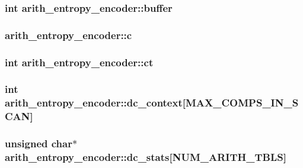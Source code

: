 \subsubsection[{buffer}]{\setlength{\rightskip}{0pt plus 5cm}int arith\+\_\+entropy\+\_\+encoder\+::buffer}\label{structarith__entropy__encoder_a404b730ace823b7212e4953146d02159}
\hypertarget{structarith__entropy__encoder_a84198956e6633b09fda5713b89164292}{}
\subsubsection[{c}]{ arith\+\_\+entropy\+\_\+encoder\+::c}\label{structarith__entropy__encoder_a84198956e6633b09fda5713b89164292}
\hypertarget{structarith__entropy__encoder_af636dab56c69b209b0bb5aefba723e80}{}
\subsubsection[{ct}]{\setlength{\rightskip}{0pt plus 5cm}int arith\+\_\+entropy\+\_\+encoder\+::ct}\label{structarith__entropy__encoder_af636dab56c69b209b0bb5aefba723e80}
\hypertarget{structarith__entropy__encoder_a1f8bc39ac0327ddbf46c65434d0ceb75}{}
\subsubsection[{dc\+\_\+context}]{\setlength{\rightskip}{0pt plus 5cm}int arith\+\_\+entropy\+\_\+encoder\+::dc\+\_\+context\mbox{[}{\bf M\+A\+X\+\_\+\+C\+O\+M\+P\+S\+\_\+\+I\+N\+\_\+\+S\+C\+A\+N}\mbox{]}}\label{structarith__entropy__encoder_a1f8bc39ac0327ddbf46c65434d0ceb75}
\hypertarget{structarith__entropy__encoder_add54e8b278b9eea4aa6ee85ea2de4307}{}
\subsubsection[{dc\+\_\+stats}]{\setlength{\rightskip}{0pt plus 5cm}unsigned char$\ast$ arith\+\_\+entropy\+\_\+encoder\+::dc\+\_\+stats\mbox{[}{\bf N\+U\+M\+\_\+\+A\+R\+I\+T\+H\+\_\+\+T\+B\+L\+S}\mbox{]}}\label{structarith__entropy__encoder_add54e8b278b9eea4aa6ee85ea2de4307}
\hypertarget{structarith__entropy__encoder_a06cb7a9a6db5a785f6630e5b5606ae5d}{}
